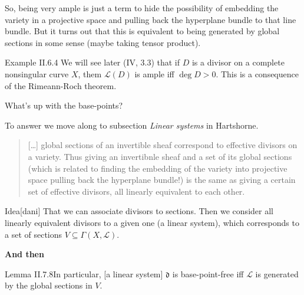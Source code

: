 So, being very ample is just a term to hide the possibility of embedding the variety in a projective space and pulling back the hyperplane bundle to that line bundle. But it turns out that this is equivalent to being generated by global sections in some sense (maybe taking tensor product).

\begin{thing4}{Example II.6.4}\label{exer:}\leavevmode
	We will see later (IV, 3.3) that if  \(D\) is a divisor on a complete nonsingular curve \(X\), them \(\mathcal{L}(D)\) is ample iff \(\operatorname{deg}D>0\). This is a consequence of the Rimeann-Roch theorem.
\end{thing4}

\begin{question}\leavevmode
What's up with the base-points?
\end{question}

To answer we move along to subsection  \textit{Linear systems} in Hartshorne.
\begin{quotation}
	[…] global sections of an invertible sheaf correspond to effective divisors on a variety. Thus giving an invertibnle sheaf and a set of its global sections {\color{6}(which is related to finding the embedding of the variety into projective space pulling back the hyperplane bundle!)} is the same as giving a certain set of effective divisors, all linearly equivalent to each other.
\end{quotation}

\begin{thing6}{Idea}[dani]\leavevmode
That we can associate divisors to sections. Then we consider all linearly equivalent divisors to a given one (a linear system), which corresponds to a set of sections \(V \subseteq \Gamma(X,\mathcal{L})\).
\end{thing6}

\textbf{And then} 
\begin{thing4}{Lemma II.7.8}\label{lem:II.7.8}\leavevmode
	[…] In particular, [a linear system] \(\mathfrak{d}\) is base-point-free iff \(\mathcal{L}\) is generated by the global sections in \(V\).
\end{thing4}
